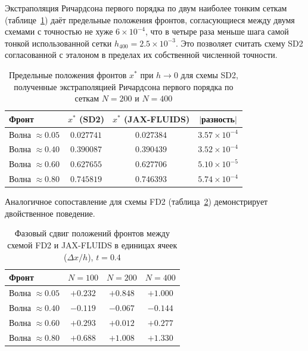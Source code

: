 \documentclass[a4paper,14pt]{extarticle}
\theoremstyle{theorem}
\theoremstyle{lemma}
\begin{document}
Экстраполяция Ричардсона первого порядка по двум наиболее тонким сеткам (таблице~\ref{tab:richardson_sd2}) даёт предельные положения фронтов, согласующиеся между двумя схемами с точностью не хуже $6 \times 10^{-4}$, что в четыре раза меньше шага самой тонкой использованной сетки $h_{400} = 2.5 \times 10^{-3}$. Это позволяет считать схему SD2 согласованной с эталоном в пределах их собственной численной точности.

\begin{table}[!htbp]
    \centering
    \caption{Предельные положения фронтов $x^*$ при $h \to 0$ для схемы SD2, полученные экстраполяцией Ричардсона первого порядка по сеткам $N=200$ и $N=400$}
    \vspace{0.1cm}
    \label{tab:richardson_sd2}
    \begin{tabular}{lccc}
        \toprule
        Фронт & $x^*$ (SD2) & $x^*$ (JAX-FLUIDS) & $|$разность$|$ \\
        \midrule
        Волна $\approx 0.05$ & $0.027741$ & $0.027384$ & $3.57 \times 10^{-4}$ \\
        Волна $\approx 0.40$ & $0.390087$ & $0.390439$ & $3.52 \times 10^{-4}$ \\
        Волна $\approx 0.60$ & $0.627655$ & $0.627706$ & $5.10 \times 10^{-5}$ \\
        Волна $\approx 0.80$ & $0.745819$ & $0.746393$ & $5.74 \times 10^{-4}$ \\
        \bottomrule
    \end{tabular}
\end{table}

Аналогичное сопоставление для схемы FD2 (таблица~\ref{tab:front_shift_fd2}) демонстрирует двойственное поведение.

\begin{table}[!htbp]
    \centering
    \caption{Фазовый сдвиг положений фронтов между схемой FD2 и JAX-FLUIDS в единицах ячеек ($\Delta x / h$), $t = 0.4$}
    \vspace{0.1cm}
    \label{tab:front_shift_fd2}
    \begin{tabular}{lccc}
        \toprule
        Фронт & $N=100$ & $N=200$ & $N=400$ \\
        \midrule
        Волна $\approx 0.05$ & $+0.232$ & $+0.848$ & $+1.000$ \\
        Волна $\approx 0.40$ & $-0.119$ & $-0.067$ & $-0.144$ \\
        Волна $\approx 0.60$ & $+0.293$ & $+0.012$ & $+0.277$ \\
        Волна $\approx 0.80$ & $+0.688$ & $+1.008$ & $+1.330$ \\
        \bottomrule
    \end{tabular}
\end{table}
\end{document}
